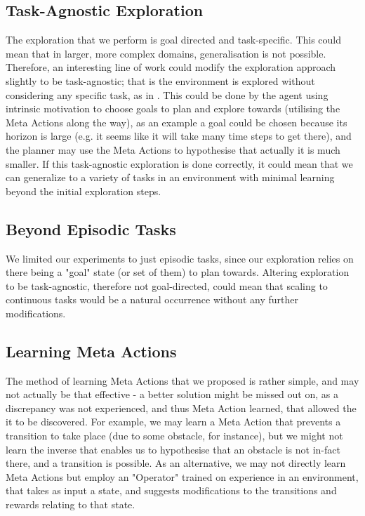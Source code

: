 \subsection{Task-Agnostic Exploration}
The exploration that we perform is goal directed and task-specific. This could mean that in larger, more complex domains, generalisation is not possible. Therefore, an interesting line of work could modify the exploration approach slightly to be task-agnostic; that is the environment is explored without considering any specific task, as in \cite{plan2explore}. This could be done by the agent using intrinsic motivation to choose goals to plan and explore towards (utilising the Meta Actions along the way), as an example a goal could be chosen because its horizon is large (e.g. it seems like it will take many time steps to get there), and the planner may use the Meta Actions to hypothesise that actually it is much smaller. If this task-agnostic exploration is done correctly, it could mean that we can generalize to a variety of tasks in an environment with minimal learning beyond the initial exploration steps.
\subsection{Beyond Episodic Tasks}
We limited our experiments to just episodic tasks, since our exploration relies on there being a "goal" state (or set of them) to plan towards. Altering exploration to be task-agnostic, therefore not goal-directed, could mean that scaling to continuous tasks would be a natural occurrence without any further modifications.
\subsection{Learning Meta Actions}
The method of learning Meta Actions that we proposed is rather simple, and may not actually be that effective - a better solution might be missed out on, as a discrepancy was not experienced, and thus Meta Action learned, that allowed the it to be discovered. For example, we may learn a Meta Action that prevents a transition to take place (due to some obstacle, for instance), but we might not learn the inverse that enables us to hypothesise that an obstacle is not in-fact there, and a transition is possible. As an alternative, we may not directly learn Meta Actions but employ an "Operator" trained on experience in an environment, that takes as input a state, and suggests modifications to the transitions and rewards relating to that state.


